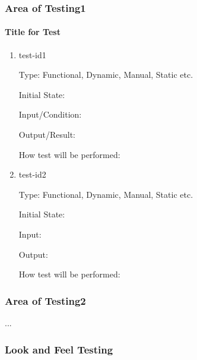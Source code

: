 \documentclass[12pt, titlepage]{article}
\begin{document}
	
	
	\subsubsection{Area of Testing1}
	
	\paragraph{Title for Test}
	
	\begin{enumerate}
		
		\item{test-id1\\}
		
		Type: Functional, Dynamic, Manual, Static etc.
		
		Initial State: 
		
		Input/Condition: 
		
		Output/Result: 
		
		How test will be performed: 
		
		\item{test-id2\\}
		
		Type: Functional, Dynamic, Manual, Static etc.
		
		Initial State: 
		
		Input: 
		
		Output: 
		
		How test will be performed: 
		
	\end{enumerate}
	
	\subsubsection{Area of Testing2}
	
	...
	
	\subsubsection{Look and Feel Testing}
	
	
\end{document}
